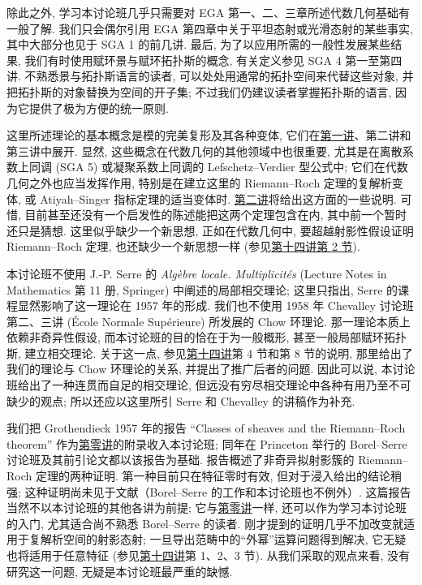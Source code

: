 除此之外, 学习本讨论班几乎只需要对 EGA 第一、二、三章所述代数几何基础有一般了解. 我们只会偶尔引用 EGA 第四章中关于平坦态射或光滑态射的某些事实, 其中大部分也见于 SGA 1 的前几讲. 最后, 为了以应用所需的一般性发展某些结果, 我们有时使用赋环景与赋环拓扑斯的概念, 有关定义参见 SGA 4 第一至第四讲. 不熟悉景与拓扑斯语言的读者, 可以处处用通常的拓扑空间来代替这些对象, 并把拓扑斯的对象替换为空间的开子集; 不过我们仍建议读者掌握拓扑斯的语言, 因为它提供了极为方便的统一原则.

这里所述理论的基本概念是模的完美复形及其各种变体, 它们在\hyperlink{sga6.e01.expose}{第一讲}、第二讲和第三讲中展开. 显然, 这些概念在代数几何的其他领域中也很重要, 尤其是在离散系数上同调 (SGA 5) 或凝聚系数上同调的 Lefschetz--Verdier 型公式中; 它们在代数几何之外也应当发挥作用, 特别是在建立这里的 Riemann--Roch 定理的复解析变体, 或 Atiyah--Singer 指标定理的适当变体时. \hyperlink{sga6.e02.expose}{第二讲}将给出这方面的一些说明. 可惜, 目前甚至还没有一个启发性的陈述能把这两个定理包含在内, 其中前一个暂时还只是猜想. 这里似乎缺少一个新思想, 正如在代数几何中, 要超越射影性假设证明 Riemann--Roch 定理, 也还缺少一个新思想一样 (参见\hyperlink{sga6.e14.sec.2}{第十四讲第 2 节}).

本讨论班不使用 J.-P. Serre 的 \emph{Algèbre locale. Multiplicités} (Lecture Notes in Mathematics 第 11 册, Springer) 中阐述的局部相交理论; 这里只指出, Serre 的课程显然影响了这一理论在 1957 年的形成. 我们也不使用 1958 年 Chevalley 讨论班第二、三讲 (École Normale Supérieure) 所发展的 Chow 环理论. 那一理论本质上依赖非奇异性假设, 而本讨论班的目的恰在于为一般概形, 甚至一般局部赋环拓扑斯, 建立相交理论. 关于这一点, 参见\hyperlink{sga6.e14.expose}{第十四讲}第 4 节和第 8 节的说明, 那里给出了我们的理论与 Chow 环理论的关系, 并提出了推广后者的问题. 因此可以说, 本讨论班给出了一种连贯而自足的相交理论, 但远没有穷尽相交理论中各种有用乃至不可缺少的观点; 所以还应以这里所引 Serre 和 Chevalley 的讲稿作为补充.

我们把 Grothendieck 1957 年的报告 ``Classes of sheaves and the Riemann--Roch theorem'' 作为\hyperlink{sga6.e00.expose}{第零讲}的附录收入本讨论班; 同年在 Princeton 举行的 Borel--Serre 讨论班及其前引论文都以该报告为基础. 报告概述了非奇异拟射影簇的 Riemann--Roch 定理的两种证明. 第一种目前只在特征零时有效, 但对于浸入给出的结论稍强; 这种证明尚未见于文献（Borel--Serre 的工作和本讨论班也不例外）. 这篇报告当然不以本讨论班的其他各讲为前提; 它与\hyperlink{sga6.e00.expose}{第零讲}一样, 还可以作为学习本讨论班的入门, 尤其适合尚不熟悉 Borel--Serre 的读者. 刚才提到的证明几乎不加改变就适用于复解析空间的射影态射; 一旦导出范畴中的“外幂”运算问题得到解决, 它无疑也将适用于任意特征 (参见\hyperlink{sga6.e14.expose}{第十四讲}第 1、2、3 节). 从我们采取的观点来看, 没有研究这一问题, 无疑是本讨论班最严重的缺憾.

